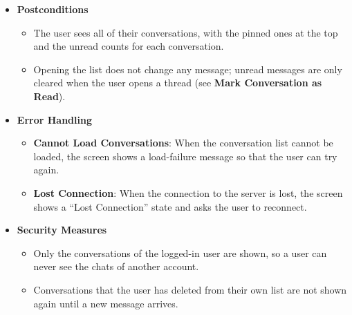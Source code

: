 \begin{itemize}[leftmargin=1.6em,topsep=4pt,itemsep=3pt,parsep=0pt,label=$\bullet$]
        \begin{itemize}[leftmargin=2.2em,topsep=2pt,itemsep=3pt,parsep=0pt,label=$\circ$]
            \item \textbf{No Conversation}: When the user has no conversation at all, the screen shows an empty state with a ``New message'' button, and the user can start a new chat from there (see \textbf{Create Conversation}).
            \item \textbf{No Search Result}: When the search keyword does not match any conversation, the list is replaced by a message telling the user that no chat matches the keyword.
        \end{itemize}
    \item \textbf{Postconditions}

        \begin{itemize}[leftmargin=2.2em,topsep=2pt,itemsep=3pt,parsep=0pt,label=$\circ$]
            \item The user sees all of their conversations, with the pinned ones at the top and the unread counts for each conversation.
            \item Opening the list does not change any message; unread messages are only cleared when the user opens a thread (see \textbf{Mark Conversation as Read}).
        \end{itemize}
    \item \textbf{Error Handling}

        \begin{itemize}[leftmargin=2.2em,topsep=2pt,itemsep=3pt,parsep=0pt,label=$\circ$]
            \item \textbf{Cannot Load Conversations}: When the conversation list cannot be loaded, the screen shows a load-failure message so that the user can try again.
            \item \textbf{Lost Connection}: When the connection to the server is lost, the screen shows a ``Lost Connection'' state and asks the user to reconnect.
        \end{itemize}
    \item \textbf{Security Measures}

        \begin{itemize}[leftmargin=2.2em,topsep=2pt,itemsep=3pt,parsep=0pt,label=$\circ$]
            \item Only the conversations of the logged-in user are shown, so a user can never see the chats of another account.
            \item Conversations that the user has deleted from their own list are not shown again until a new message arrives.
        \end{itemize}
\end{itemize}

